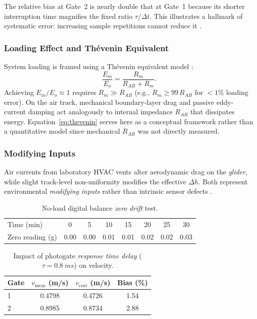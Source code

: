\documentclass[a4paper, 12pt]{article}
\begin{document}
            The relative bias at Gate~2 is nearly double that at Gate~1 because its shorter interruption time magnifies the fixed ratio $\tau/\Delta t$. This illustrates a hallmark of systematic error: increasing sample repetitions cannot reduce it \parencite{Taylor1997}.

            \subsubsection{Loading Effect and Th\'evenin Equivalent}
            System loading is framed using a Th\'evenin equivalent model \parencite{Bentley2005}:
            \begin{equation}
                \frac{E_m}{E_o}=\frac{R_m}{R_{AB}+R_m}.
                \label{eq:thevenin}
            \end{equation}
            Achieving $E_m/E_o\approx1$ requires $R_m\gg R_{AB}$ (e.g., $R_m\ge 99\,R_{AB}$ for $<1\%$ loading error). On the air track, mechanical boundary-layer drag and passive eddy-current damping act analogously to internal impedance $R_{AB}$ that dissipates energy. Equation~\eqref{eq:thevenin} serves here as a conceptual framework rather than a quantitative model since mechanical $R_{AB}$ was not directly measured.

            \subsubsection{Modifying Inputs}
            Air currents from laboratory HVAC vents alter aerodynamic drag on the \textit{glider}, while slight track-level non-uniformity modifies the effective $\Delta h$. Both represent environmental \textit{modifying inputs} rather than intrinsic sensor defects \parencite{Bentley2005}.
\begin{table}[H]
\centering
\singlespacing
\caption{No-load digital balance \textit{zero drift} test.}
\label{tab:drift}
\small
\begin{tabular}{l *{7}{S[table-format=1.2]}}
\toprule
Time (min) & {0} & {5} & {10} & {15} & {20} & {25} & {30}\\
Zero reading (g) & 0.00 & 0.00 & 0.01 & 0.01 & 0.02 & 0.02 & 0.03\\
\bottomrule
\end{tabular}
\end{table}

\begin{table}[H]
\centering
\singlespacing
\caption{Impact of photogate \textit{response time delay} ($\tau=\SI{0.8}{ms}$) on velocity.}
\label{tab:delay}
\small
\begin{tabular}{l S[table-format=1.4] S[table-format=1.4] S[table-format=1.2]}
\toprule
\textbf{Gate} & {$v_{\mathrm{meas}}$ (m/s)} & {$v_{\mathrm{corr}}$ (m/s)} & {Bias (\%)}\\
 & 0.4798 & 0.4726 & 1.54\\
2 & 0.8985 & 0.8734 & 2.88\\
\bottomrule
\end{tabular}
\end{table}
\end{document}
